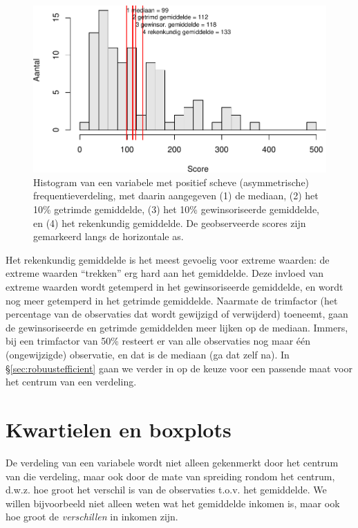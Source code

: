 \documentclass[
]{book}
\begin{document}
\begin{figure}
\centering
\includegraphics{KMS-NL_files/figure-latex/centrummaten-1.pdf}
\caption{\label{fig:centrummaten}Histogram van een variabele met positief scheve (asymmetrische) frequentieverdeling, met daarin aangegeven (1) de mediaan, (2) het 10\% getrimde gemiddelde, (3) het 10\% gewinsoriseerde gemiddelde, en (4) het rekenkundig gemiddelde. De geobserveerde scores zijn gemarkeerd langs de horizontale as.}
\end{figure}

Het rekenkundig gemiddelde is het meest gevoelig voor extreme waarden:
de extreme waarden ``trekken'' erg hard aan het gemiddelde. Deze invloed
van extreme waarden wordt getemperd in het gewinsoriseerde gemiddelde,
en wordt nog meer getemperd in het getrimde gemiddelde. Naarmate de
trimfactor (het percentage van de observaties dat wordt gewijzigd of
verwijderd) toeneemt, gaan de gewinsoriseerde en getrimde gemiddelden
meer lijken op de mediaan. Immers, bij een trimfactor van 50\% resteert
er van alle observaties nog maar één (ongewijzigde) observatie, en dat
is de mediaan (ga dat zelf na). In
§\ref{sec:robuustefficient} gaan we verder in op de keuze voor een
passende maat voor het centrum van een verdeling.

\hypertarget{sec:kwartielen-en-boxplots}{%
\section{Kwartielen en boxplots}\label{sec:kwartielen-en-boxplots}}

De verdeling van een variabele wordt niet alleen gekenmerkt door het
centrum van die verdeling, maar ook door de mate van spreiding rondom
het centrum, d.w.z. hoe groot het verschil is van de observaties t.o.v.
het gemiddelde. We willen bijvoorbeeld niet alleen weten wat het
gemiddelde inkomen is, maar ook hoe groot de \emph{verschillen} in inkomen
zijn.
\end{document}
